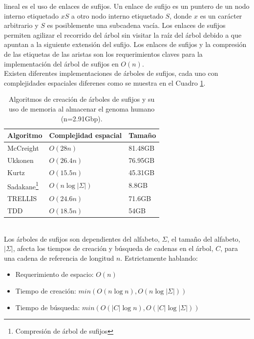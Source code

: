 \documentclass[11pt,a4paper,english]{article}
\begin{document}
lineal es el uso de enlaces de sufijos. Un enlace de sufijo es un puntero de un 
nodo interno etiquetado $xS$ a otro nodo interno etiquetado $S$, donde $x$ es un 
carácter arbitrario y $S$ es posiblemente una subcadena vacía. Los enlaces de 
sufijos permiten agilizar el recorrido del árbol sin visitar la raíz del árbol 
debido a que apuntan a la siguiente extensión del sufijo. Los enlaces de sufijos 
y la compresión de las etiquetas de las aristas son los requerimientos claves 
para la implementación del árbol de sufijos en $O(n)$.\\
\indent
Existen diferentes implementaciones de árboles de sufijos, cada uno con 
complejidades espaciales diferenes como se muestra en el Cuadro \ref{tab:stmem}.\\
\begin{table}[h!]  
\begin{small}
\begin{center}
\begin{tabular}{lll}
Algoritmo & Complejidad espacial & Tamaño \\
\hline
McCreight & $O(28n)$ & 81.48GB \\
\hline
Ukkonen & $O(26.4n)$ & 76.95GB \\
\hline
Kurtz & $O(15.5n)$ & 45.31GB \\
\hline
Sadakane\footnote{Compresión de árbol de sufijos} & $O(n\log|\Sigma|)$ & 8.8GB \\
\hline
TRELLIS \cite{Phoophakdee2007} & $O(24.6n)$ & 71.6GB \\
\hline
TDD \cite{Barsky2010} & $O(18.5n)$ & 54GB \\
\end{tabular}
\end{center}
\end{small}
\caption{Algoritmos de creación de árboles de sufijos y su uso de memoria al
almacenar el genoma humano (n=2.91Gbp).}
\label{tab:stmem}
\end{table}
\\ \indent
Los árboles de sufijos son dependientes del alfabeto, $\Sigma$, el tamaño 
del alfabeto, $|\Sigma|$, afecta los tiempos de creación y búsqueda de 
cadenas en el árbol, $C$, para una cadena de referencia de longitud $n$. 
Estrictamente hablando:
    \begin{itemize} 
      \item Requerimiento de espacio: $O(n)$ 
      \item Tiempo de creación: $min (O(n\log n), O(n\log |\Sigma|))$ 
      \item Tiempo de búsqueda: $min (O(|C|\log n), O(|C|\log |\Sigma|))$ 
    \end{itemize}
\end{document}
